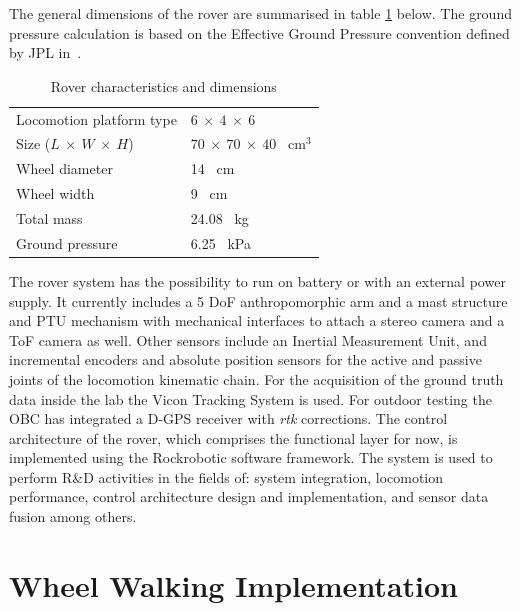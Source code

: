 \documentclass[a4paper,twocolumn]{esapub2005} %
\begin{document}
The general dimensions of the rover are summarised in table 
\ref{tab:ExoterDimensionsTable} below. The ground pressure calculation is based 
on the Effective Ground Pressure convention defined by JPL 
in~\cite{ROB:ROB21481}.

\begin{table}[h!]
	\begin{tabular}{ll}
	Locomotion platform type       & $6~\times~4~\times~6$             \\
	Size ($L~\times~W~\times~H$)   & $70~\times~70~\times~40$ ~\unit{cm$^3$} \\
	Wheel diameter                 & 14 ~\unit{cm}    \\
	Wheel width                    & 9 ~\unit{cm}     \\
	Total mass                     & 24.08 ~\unit{kg} \\
	Ground pressure                & 6.25 ~\unit{kPa}        
	\end{tabular}
	\caption{Rover characteristics and dimensions}
	\label{tab:ExoterDimensionsTable}
\end{table}

The rover system has the possibility to run on battery or with an external power supply. It currently includes a 5 DoF anthropomorphic arm and a mast
structure and PTU mechanism with mechanical interfaces to attach a stereo
camera and a ToF camera as well. Other sensors include an Inertial Measurement
Unit, and incremental encoders and absolute position sensors for the active and
passive joints of the locomotion kinematic chain. For the acquisition of the
ground truth data inside the lab the Vicon Tracking System is used. For outdoor
testing the OBC has integrated a D-GPS receiver with \textit{rtk} corrections.
The control architecture of the rover, which comprises the functional layer for
now, is implemented using the Rock\footnotemark[1] robotic software framework. The
system is used to perform R\&D activities in the fields of: system integration,
locomotion performance, control architecture design and implementation, and
sensor data fusion among others. 


\section{Wheel Walking Implementation}
\end{document}
